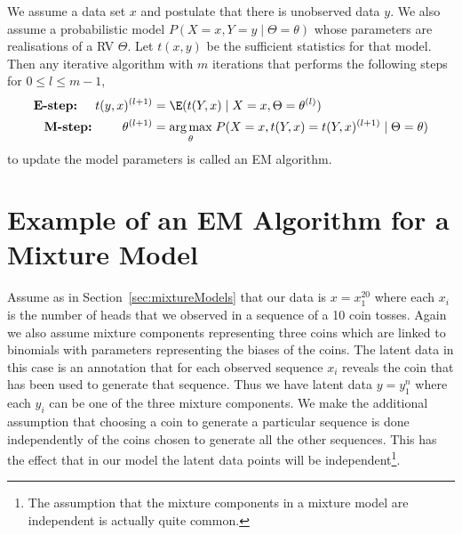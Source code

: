 \begin{Definition}[EM algorithm]\label{def:EM}
We assume a data set $ x $ and postulate that there is unobserved data $ y $. We also
assume a probabilistic model $ P(X=x,Y=y \mid \Theta = \theta) $ whose parameters are realisations of a RV
$ \Theta $. Let $ t(x,y) $ be the sufficient statistics for that model. Then any
iterative algorithm with $ m $ iterations that performs the following
steps for $0\leq l \leq m-1$, 
\begin{align*}
\mbox{\textbf{E-step:} } \quad t(y,x)^{(l+1)} &= \E(t(Y,x) \mid X = x, \Theta = \theta^{(l)}) \\
\mbox{\textbf{M-step:} } \qquad \theta^{(l+1)} &= \underset{\theta}{\arg\max} \; P(X=x, t(Y,x) = t(Y,x)^{(l+1)} \mid \Theta = \theta) 
\end{align*}
to update the model parameters is called an EM algorithm. 
\end{Definition}

\section{Example of an EM Algorithm for a Mixture Model}

Assume as in Section~\ref{sec:mixtureModels} that our data is $ x=x^{20}_{1} $ where each $ x_{i} $ is the 
number of heads that we observed in a sequence of a 10 coin tosses. Again we also assume mixture components representing three coins which are linked
to binomials with parameters representing the biases of the coins. 
The latent data in this case is an annotation that for each observed sequence $ x_{i} $ reveals the coin that has been used
to generate that sequence. Thus we have latent data $ y=y_{1}^{n} $ where each $ y_{i} $ can be one of the three mixture components. 
We make the additional assumption that choosing a coin to generate a particular sequence is done independently of the coins chosen
to generate all the other sequences. This has the effect that in our model the latent data points will be independent\footnote{The assumption
that the mixture components in a mixture model are independent is actually quite common.}.

